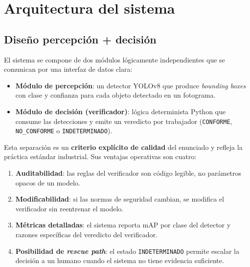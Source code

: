 \documentclass[journal,onecolumn,11pt]{IEEEtran}
\begin{document}
\section{Arquitectura del sistema}

\subsection{Diseño percepción + decisión}

El sistema se compone de dos módulos lógicamente independientes que
se comunican por una interfaz de datos clara:

\begin{itemize}[leftmargin=*]
    \item \textbf{Módulo de percepción}: un detector YOLOv8 que
    produce \textit{bounding boxes} con clase y confianza para cada
    objeto detectado en un fotograma.
    \item \textbf{Módulo de decisión (verificador)}: lógica
    determinista Python que consume las detecciones y emite un
    veredicto por trabajador (\texttt{CONFORME},
    \texttt{NO\_CONFORME} o \texttt{INDETERMINADO}).
\end{itemize}

Esta separación es un \textbf{criterio explícito de calidad} del
enunciado y refleja la práctica estándar industrial. Sus ventajas
operativas son cuatro:

\begin{enumerate}[leftmargin=*]
    \item \textbf{Auditabilidad}: las reglas del verificador son
    código legible, no parámetros opacos de un modelo.
    \item \textbf{Modificabilidad}: si las normas de seguridad
    cambian, se modifica el verificador sin reentrenar el modelo.
    \item \textbf{Métricas detalladas}: el sistema reporta mAP por
    clase del detector y razones específicas del veredicto del
    verificador.
    \item \textbf{Posibilidad de \textit{rescue path}}: el estado
    \texttt{INDETERMINADO} permite escalar la decisión a un humano
    cuando el sistema no tiene evidencia suficiente.
\end{enumerate}
\end{document}
